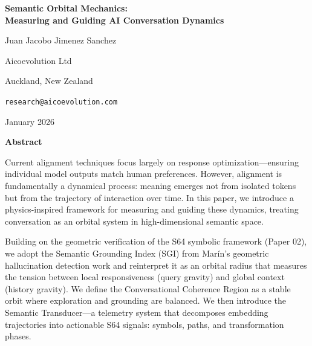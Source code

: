 
\begingroup
\setlength{\parindent}{0pt}
\begin{center}
{\LARGE\bfseries Semantic Orbital Mechanics:\\Measuring and Guiding AI Conversation Dynamics\par}
\vspace{1.5em}
{\large Juan Jacobo Jimenez Sanchez\par}
\vspace{0.3em}
{\normalsize Aicoevolution Ltd\par}
{\normalsize Auckland, New Zealand\par}
{\normalsize \texttt{research@aicoevolution.com}\par}
\vspace{1em}
{\normalsize January 2026\par}
\end{center}
\endgroup

\vspace{1.5em}

\noindent\textbf{Abstract}

\vspace{0.5em}

\noindent Current alignment techniques focus largely on response optimization---ensuring individual model outputs match human preferences. However, alignment is fundamentally a dynamical process: meaning emerges not from isolated tokens but from the trajectory of interaction over time. In this paper, we introduce a physics-inspired framework for measuring and guiding these dynamics, treating conversation as an orbital system in high-dimensional semantic space.

\vspace{0.5em}

\noindent Building on the geometric verification of the S64 symbolic framework (Paper 02), we adopt the Semantic Grounding Index (SGI) from Mar\'in's geometric hallucination detection work and reinterpret it as an orbital radius that measures the tension between local responsiveness (query gravity) and global context (history gravity). We define the Conversational Coherence Region as a stable orbit where exploration and grounding are balanced. We then introduce the Semantic Transducer---a telemetry system that decomposes embedding trajectories into actionable S64 signals: symbols, paths, and transformation phases.

\vspace{0.5em}

